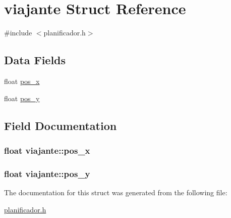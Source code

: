 \hypertarget{structviajante}{\section{viajante Struct Reference}
\label{structviajante}
}


{\ttfamily \#include $<$planificador.\+h$>$}

\subsection*{Data Fields}
\begin{DoxyCompactItemize}
\item 
float \hyperlink{structviajante_a15c4038a499a73c5467f7c5c14fb489d}{pos\+\_\+x}
\item 
float \hyperlink{structviajante_adf545057d4d88d1a952a4e686f7724eb}{pos\+\_\+y}
\end{DoxyCompactItemize}


\subsection{Field Documentation}
\hypertarget{structviajante_a15c4038a499a73c5467f7c5c14fb489d}{
\subsubsection[{pos\+\_\+x}]{\setlength{\rightskip}{0pt plus 5cm}float viajante\+::pos\+\_\+x}}\label{structviajante_a15c4038a499a73c5467f7c5c14fb489d}
\hypertarget{structviajante_adf545057d4d88d1a952a4e686f7724eb}{
\subsubsection[{pos\+\_\+y}]{\setlength{\rightskip}{0pt plus 5cm}float viajante\+::pos\+\_\+y}}\label{structviajante_adf545057d4d88d1a952a4e686f7724eb}


The documentation for this struct was generated from the following file\+:\begin{DoxyCompactItemize}
\item 
\hyperlink{planificador_8h}{planificador.\+h}\end{DoxyCompactItemize}

